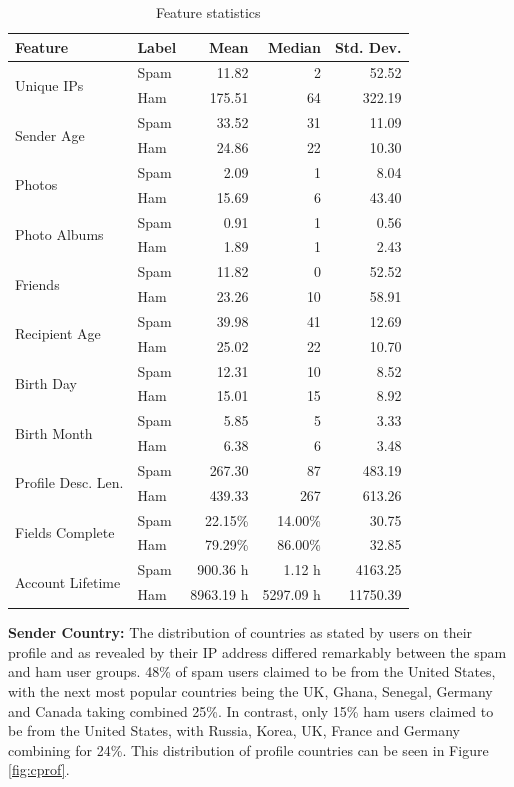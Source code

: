 \documentclass[preprint]{acm_proc_article-sp}
\begin{document}
\begin{table}
\small
\begin{tabular}{|l|l|r|r|r|}
    \hline
    \textbf{Feature} & \textbf{Label} & \textbf{Mean} & \textbf{Median} & \textbf{Std. Dev.}\\
    \hline
    \multirow{2}{*}{Unique IPs} & Spam & 11.82 & 2 & 52.52\\
    & Ham & 175.51 & 64 & 322.19\\
    \hline
    \multirow{2}{*}{Sender Age} & Spam & 33.52 & 31 & 11.09\\
    & Ham & 24.86 & 22 & 10.30\\
    \hline
    \multirow{2}{*}{Photos} & Spam & 2.09 & 1 & 8.04\\
    & Ham & 15.69 & 6 & 43.40\\
    \hline
    \multirow{2}{*}{Photo Albums} & Spam & 0.91 & 1 & 0.56\\
    & Ham & 1.89 & 1 & 2.43\\
    \hline
    \multirow{2}{*}{Friends} & Spam & 11.82 & 0 & 52.52\\
    & Ham & 23.26 & 10 & 58.91\\
    \hline
    \multirow{2}{*}{Recipient Age} & Spam & 39.98 & 41 & 12.69\\
    & Ham & 25.02 & 22 & 10.70\\
    \hline
    \multirow{2}{*}{Birth Day} & Spam & 12.31 & 10 & 8.52\\
    & Ham & 15.01 & 15 & 8.92\\
    \hline
    \multirow{2}{*}{Birth Month} & Spam & 5.85 & 5 & 3.33\\
    & Ham & 6.38 & 6 & 3.48\\
    \hline
    \multirow{2}{*}{Profile Desc. Len.} & Spam & 267.30 & 87 & 483.19\\
    & Ham & 439.33 & 267 & 613.26\\
    \hline
    \multirow{2}{*}{Fields Complete} & Spam & 22.15\% & 14.00\% & 30.75\\
    & Ham & 79.29\% & 86.00\% & 32.85\\
    \hline
    \multirow{2}{*}{Account Lifetime} & Spam & 900.36 h & 1.12 h & 4163.25\\
    & Ham & 8963.19 h & 5297.09 h & 11750.39 \\
    \hline
\end{tabular}
\caption{Feature statistics}
\label{tab:feats}
\end{table}

\textbf{Sender Country:} The distribution of countries as stated by users on their profile and as 
revealed by their IP address differed remarkably between the spam and ham user groups. 
48\% of spam users claimed to be from the United States, with the next most popular 
countries being the UK, Ghana, Senegal, Germany and Canada taking combined 25\%. 
In contrast, only 15\% ham users claimed to be from the United States, with Russia, 
Korea, UK, France and Germany combining for 24\%. This distribution of profile countries can 
be seen in Figure \ref{fig:cprof}.
\end{document}
